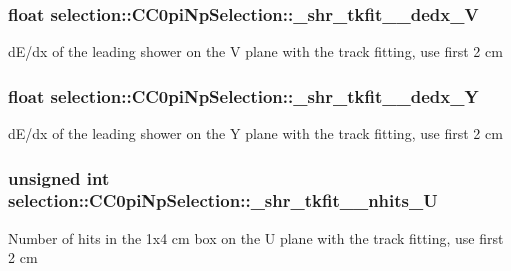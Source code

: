 \subsubsection[{\texorpdfstring{\+\_\+shr\+\_\+tkfit\+\_\+2cm\+\_\+dedx\+\_\+V}{_shr_tkfit_2cm_dedx_V}}]{\setlength{\rightskip}{0pt plus 5cm}float selection\+::\+C\+C0pi\+Np\+Selection\+::\+\_\+shr\+\_\+tkfit\+\_\+2cm\+\_\+dedx\+\_\+V\hspace{0.3cm}{\ttfamily [private]}}\hypertarget{classselection_1_1CC0piNpSelection_a02be9f071fa5ee210e34b5914d428591}{}\label{classselection_1_1CC0piNpSelection_a02be9f071fa5ee210e34b5914d428591}
d\+E/dx of the leading shower on the V plane with the track fitting, use first 2 cm 
\subsubsection[{\texorpdfstring{\+\_\+shr\+\_\+tkfit\+\_\+2cm\+\_\+dedx\+\_\+Y}{_shr_tkfit_2cm_dedx_Y}}]{\setlength{\rightskip}{0pt plus 5cm}float selection\+::\+C\+C0pi\+Np\+Selection\+::\+\_\+shr\+\_\+tkfit\+\_\+2cm\+\_\+dedx\+\_\+Y\hspace{0.3cm}{\ttfamily [private]}}\hypertarget{classselection_1_1CC0piNpSelection_a3fce1b66b45df22120481d91b16957ba}{}\label{classselection_1_1CC0piNpSelection_a3fce1b66b45df22120481d91b16957ba}
d\+E/dx of the leading shower on the Y plane with the track fitting, use first 2 cm 
\subsubsection[{\texorpdfstring{\+\_\+shr\+\_\+tkfit\+\_\+2cm\+\_\+nhits\+\_\+U}{_shr_tkfit_2cm_nhits_U}}]{\setlength{\rightskip}{0pt plus 5cm}unsigned int selection\+::\+C\+C0pi\+Np\+Selection\+::\+\_\+shr\+\_\+tkfit\+\_\+2cm\+\_\+nhits\+\_\+U\hspace{0.3cm}{\ttfamily [private]}}\hypertarget{classselection_1_1CC0piNpSelection_ab659c0c62a77c77e745829478828e100}{}\label{classselection_1_1CC0piNpSelection_ab659c0c62a77c77e745829478828e100}
Number of hits in the 1x4 cm box on the U plane with the track fitting, use first 2 cm 
